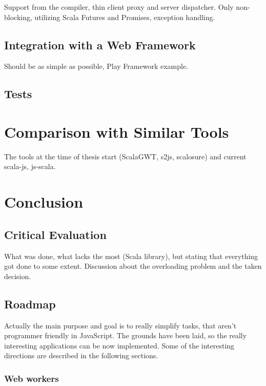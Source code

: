 \documentclass[12pt,a4paper]{report}
\begin{document}
Support from the compiler, thin client proxy and server dispatcher. Only non-blocking, utilizing Scala Futures and Promises, exception handling.

\section{Integration with a Web Framework}

Should be as simple as possible, Play Framework example.

\section{Tests}



\chapter{Comparison with Similar Tools}

The tools at the time of thesis start (ScalaGWT, s2js, scalosure) and current scala-js, js-scala.



\chapter{Conclusion}

\section{Critical Evaluation}

What was done, what lacks the most (Scala library), but stating that everything got done to some extent. Discussion about the overloading problem and the taken decision.

\section{Roadmap}

Actually the main purpose and goal is to really simplify tasks, that aren't programmer friendly in JavaScript. The grounds have been laid, so the really interesting applications can be now implemented. Some of the interesting directions are described in the following sections.

\subsection{Web workers}
\end{document}
